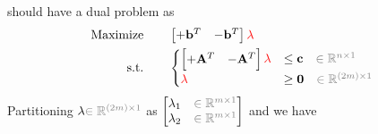 \documentclass[twocolumn]{ctexart}
\begin{document}
should have a dual problem as
\begin{equation}
    \begin{aligned}
        \label{eq:primal_standard_dual}
        \text{Maximize} \qquad &
            \begin{bmatrix}  +\mathbf{b}^T  &  -\mathbf{b}^T \end{bmatrix}
            \mathbf{\color{red} \lambda}
        \\
        \text{s.t.} \qquad &
            \begin{cases}
                \begin{bmatrix}  +\mathbf{A}^T  &  -\mathbf{A}^T \end{bmatrix}
                \mathbf{\color{red} \lambda}  &  \leq  \mathbf{c}  {\color{gray} \quad \in \mathbb{R}^{n \times 1}}  \\
                \mathbf{\color{red} \lambda}  &  \geq  \mathbf{0}  {\color{gray} \quad \in \mathbb{R}^{(2m) \times 1}}  \\
            \end{cases}
    \end{aligned}
\end{equation}
Partitioning $\mathbf{\lambda} {\color{gray} \in \mathbb{R}^{(2m) \times 1}}$
as $\begin{bmatrix}  \mathbf{\lambda}_1  {\color{gray} \quad \in \mathbb{R}^{m \times 1}}  \\  \mathbf{\lambda}_2  {\color{gray} \quad \in \mathbb{R}^{m \times 1}} \end{bmatrix}$
and we have
\end{document}

